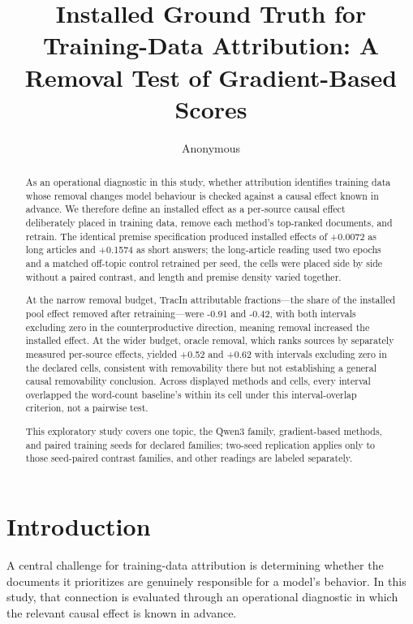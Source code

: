 \documentclass[10pt]{article}
\title{ Installed Ground Truth for Training-Data Attribution: A Removal Test of Gradient-Based Scores }
\author{ Anonymous }
\date{}
\begin{document}
\maketitle




\begin{abstract}
As an operational diagnostic in this study, whether attribution identifies training data whose removal changes model behaviour is checked against a causal effect known in advance. We therefore define an installed effect as a per-source causal effect deliberately placed in training data, remove each method’s top-ranked documents, and retrain. The identical premise specification produced installed effects of +0.0072 as long articles and +0.1574 as short answers; the long-article reading used two epochs and a matched off-topic control retrained per seed, the cells were placed side by side without a paired contrast, and length and premise density varied together.

At the narrow removal budget, TracIn attributable fractions—the share of the installed pool effect removed after retraining—were -0.91 and -0.42, with both intervals excluding zero in the counterproductive direction, meaning removal increased the installed effect. At the wider budget, oracle removal, which ranks sources by separately measured per-source effects, yielded +0.52 and +0.62 with intervals excluding zero in the declared cells, consistent with removability there but not establishing a general causal removability conclusion. Across displayed methods and cells, every interval overlapped the word-count baseline’s within its cell under this interval-overlap criterion, not a pairwise test.

This exploratory study covers one topic, the Qwen3 family, gradient-based methods, and paired training seeds for declared families; two-seed replication applies only to those seed-paired contrast families, and other readings are labeled separately.


\end{abstract}



\section{ Introduction }
\label{sec:introduction}

A central challenge for training-data attribution is determining whether the documents it prioritizes are genuinely responsible for a model’s behavior. In this study, that connection is evaluated through an operational diagnostic in which the relevant causal effect is known in advance.
\end{document}

